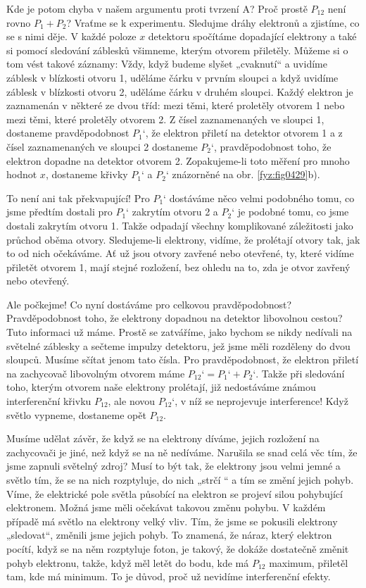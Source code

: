     Kde je potom chyba v našem argumentu proti tvrzení A? Proč prostě \(P_{12}\) není rovno
    \(P_1+P_2\)? Vraťme se k experimentu. Sledujme dráhy elektronů a zjistíme, co se s nimi děje. V
    každé poloze \(x\) detektoru spočítáme dopadající elektrony a také si pomocí sledování záblesků
    všimneme, kterým otvorem přiletěly. Můžeme si o tom vést takové záznamy: Vždy, když budeme
    slyšet „cvaknutí“ a uvidíme záblesk v blízkosti otvoru 1, uděláme čárku v prvním sloupci a když
    uvidíme záblesk v blízkosti otvoru 2, uděláme čárku v druhém sloupci. Každý elektron je
    zaznamenán v některé ze dvou tříd: mezi těmi, které proletěly otvorem 1 nebo mezi těmi, které
    proletěly otvorem 2. Z čísel zaznamenaných ve sloupci 1, dostaneme pravděpodobnost \(P_1‘\), že
    elektron přiletí na detektor otvorem 1 a z čísel zaznamenaných ve sloupci 2 dostaneme \(P_2‘\),
    pravděpodobnost toho, že elektron dopadne na detektor otvorem 2. Zopakujeme-li toto měření pro
    mnoho hodnot \(x\), dostaneme křivky \(P_1‘\) a \(P_2‘\) znázorněné na obr. \ref{fyz:fig0429}b).
    
    To není ani tak překvapující! Pro \(P_1‘\) dostáváme něco velmi podobného tomu, co jsme předtím
    dostali pro \(P_1‘\) zakrytím otvoru 2 a \(P_2‘\) je podobné tomu, co jsme dostali zakrytím
    otvoru 1. Takže odpadají všechny komplikované záležitosti jako průchod oběma otvory.
    Sledujeme-li elektrony, vidíme, že prolétají otvory tak, jak to od nich očekáváme. Ať už jsou
    otvory zavřené nebo otevřené, ty, které vidíme přiletět otvorem 1, mají stejné rozložení, bez
    ohledu na to, zda je otvor zavřený nebo otevřený.
    
    Ale počkejme! Co nyní dostáváme pro celkovou pravděpodobnost? Pravděpodobnost toho, že elektrony
    dopadnou na detektor libovolnou cestou? Tuto informaci už máme. Prostě se zatváříme, jako bychom
    se nikdy nedívali na světelné záblesky a sečteme impulzy detektoru, jež jsme měli rozděleny do
    dvou sloupců. Musíme sčítat jenom tato čísla. Pro pravděpodobnost, že elektron přiletí na
    zachycovač libovolným otvorem máme \(P_{12}‘ = P_1‘ + P_2‘\). Takže při sledování toho, kterým
    otvorem naše elektrony prolétají, již nedostáváme známou interferenční křivku \(P_{12}\), ale
    novou \(P_{12}‘\), v níž se neprojevuje interference! Když světlo vypneme, dostaneme opět
    \(P_{12}\).

    Musíme udělat závěr, že když se na elektrony díváme, jejich rozložení na zachycovači je jiné,
    než když se na ně nedíváme. Narušila se snad celá věc tím, že jsme zapnuli světelný zdroj? Musí
    to být tak, že elektrony jsou velmi jemné a světlo tím, že se na nich rozptyluje, do nich „strčí
    “ a tím se změní jejich pohyb. Víme, že elektrické pole světla působící na elektron se projeví
    silou pohybující elektronem. Možná jsme měli očekávat takovou změnu pohybu. V každém případě má
    světlo na elektrony velký vliv. Tím, že jsme se pokusili elektrony „sledovat“, změnili jsme
    jejich pohyb. To znamená, že náraz, který elektron pocítí, když se na něm rozptyluje foton, je
    takový, že dokáže dostatečně změnit pohyb elektronu, takže, když měl letět do bodu, kde má
    \(P_{12}\) maximum, přiletěl tam, kde má minimum. To je důvod, proč už nevidíme interferenční
    efekty.
    
